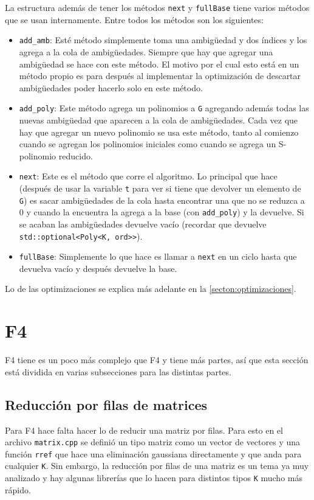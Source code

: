 \documentclass[12pt]{report}
\theoremstyle{customstyle}
\theoremstyle{factstyle}
\begin{document}
La estructura además de tener los métodos \texttt{next} y \texttt{fullBase} tiene varios métodos que se usan internamente. Entre todos los métodos son los siguientes:

\begin{itemize}
  \item \texttt{add\_amb}: Esté método simplemente toma una ambigüedad y dos índices y los agrega a la cola de ambigüedades. Siempre que hay que agregar una ambigüedad se hace con este método. El motivo por el cual esto está en un método propio es para después al implementar la optimización de descartar ambigüedades poder hacerlo solo en este método.
  \item \texttt{add\_poly}: Este método agrega un polinomios a \texttt{G} agregando además todas las nuevas ambigüedad que aparecen a la cola de ambigüedades. Cada vez que hay que agregar un nuevo polinomio se usa este método, tanto al comienzo cuando se agregan los polinomios iniciales como cuando se agrega un S-polinomio reducido.
  \item \texttt{next}: Este es el método que corre el algoritmo. Lo principal que hace (después de usar la variable \texttt{t} para ver si tiene que devolver un elemento de \texttt{G}) es sacar ambigüedades de la cola hasta encontrar una que no se reduzca a $0$ y cuando la encuentra la agrega a la base (con \texttt{add\_poly}) y la devuelve. Si se acaban las ambigüedades devuelve vacío (recordar que devuelve \texttt{std::optional<Poly<K, ord>>}).
  \item \texttt{fullBase}: Simplemente lo que hace es llamar a \texttt{next} en un ciclo hasta que devuelva vacío y después devuelve la base.
\end{itemize}

Lo de las optimizaciones se explica más adelante en la \cref{secton:optimizaciones}.


\section{F4}

F4 tiene es un poco más complejo que F4 y tiene más partes, así que esta sección está dividida en varias subsecciones para las distintas partes.

\subsection{Reducción por filas de matrices}

Para F4 hace falta hacer lo de reducir una matriz por filas. Para esto en el archivo \texttt{matrix.cpp} se definió un tipo matriz como un vector de vectores y una función \texttt{rref} que hace una eliminación gaussiana directamente y que anda para cualquier \texttt{K}. Sin embargo, la reducción por filas de una matriz es un tema ya muy analizado y hay algunas librerías que lo hacen para distintos tipos \texttt{K} mucho más rápido.
\end{document}

